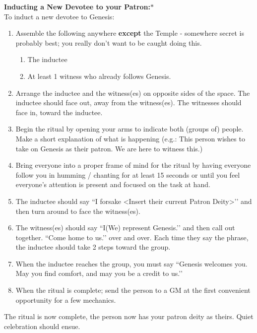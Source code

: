 \documentclass[green]{GL2020}
\begin{document}
   
\textbf{Inducting a New Devotee to your Patron:}$*$\\
To induct a new devotee to Genesis:
\begin{enumerate}
  \item Assemble the following anywhere \textbf{except} the Temple - somewhere secret is probably best; you really don’t want to be caught doing this.
  \begin{enumerate}
    \item The inductee
    \item At least 1 witness who already follows Genesis.
  \end{enumerate}
  \item Arrange the inductee and the witness(es) on opposite sides of the space. The inductee should face out, away from the witness(es). The witnesses should face in, toward the inductee.
  \item Begin the ritual by opening your arms to indicate both (groups of) people. Make a short explanation of what is happening (e.g.: This person wishes to take on Genesis as their patron. We are here to witness this.)
  \item Bring everyone into a proper frame of mind for the ritual by having everyone follow you in humming / chanting for at least 15 seconds or until you feel everyone’s attention is present and focused on the task at hand.
  \item The inductee should say ``I forsake <Insert their current Patron Deity>’’ and then turn around to face the witness(es).
  \item The witness(es) should say ``I(We) represent Genesis.’’ and then call out together. ``Come home to us.’’ over and over. Each time they say the phrase, the inductee should take 2 steps toward the group.
  \item When the inductee reaches the group, you must say ``Genesis welcomes you. May you find comfort, and may you be a credit to us.’’
  \item When the ritual is complete; send the person to a GM at the first convenient opportunity for a few mechanics.
\end{enumerate}

The ritual is now complete, the person now has your patron deity as theirs. Quiet celebration should ensue.
\end{document}
